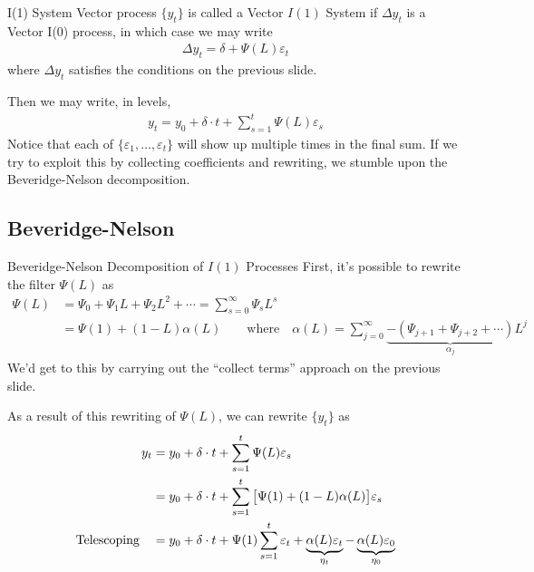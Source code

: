 \documentclass[aspectratio=169, handout]{beamer}
\begin{document}
{\footnotesize
\begin{frame}{I(1) System}
Vector process $\{y_t\}$ is called a \alert{Vector $I(1)$ System}
if $\Delta y_t$ is a Vector I(0) process, in which case we may write
\begin{align*}
  \Delta y_t = \delta + \Psi(L)\varepsilon_t
\end{align*}
where $\Delta y_t$ satisfies the conditions on the previous slide.

\pause
Then we may write, in levels,
\begin{align*}
  y_t
  = y_0 + \delta \cdot t + \sum_{s=1}^t \Psi(L)\varepsilon_s
\end{align*}
\pause
Notice that each of $\{\varepsilon_1,\ldots,\varepsilon_t\}$ will show
up multiple times in the final sum.
If we try to exploit this by \alert{collecting coefficients} and
rewriting, we stumble upon the Beveridge-Nelson decomposition.
\end{frame}
}


\subsection{Beveridge-Nelson}

{\footnotesize
\begin{frame}{Beveridge-Nelson Decomposition of $I(1)$ Processes}
First, it's possible to rewrite the filter $\Psi(L)$ as
\begin{align*}
  \Psi(L)
  &=
  \Psi_0 + \Psi_1L + \Psi_2L^2
  + \cdots
  =
  \sum_{s=0}^\infty
  \Psi_s L^s
  \\
  &=
  \Psi(1)
  +
  (1-L)\alpha(L)
  \qquad\text{where}\quad
  \alpha(L)
  =
  \sum_{j=0}^\infty
  \underbrace{-(\Psi_{j+1}+\Psi_{j+2}+\cdots)}_{\alpha_j}
  L^j
\end{align*}
We'd get to this by carrying out the ``collect terms''
approach on the previous slide.

\pause
As a result of this rewriting of $\Psi(L)$, we can rewrite $\{y_t\}$ as
\begin{align*}
  y_t
  &= y_0 + \delta \cdot t + \sum_{s=1}^t \Psi(L)\varepsilon_s
  \\
  &= y_0 + \delta \cdot t
  + \sum_{s=1}^t
  \big[
    \Psi(1)
    + (1-L)\alpha(L)
  \big]
  \varepsilon_s
  \\
  \text{Telescoping}
  \quad
  &=
  y_0
  + \delta \cdot t
  +
  \Psi(1)
  \sum_{s=1}^t
  \varepsilon_t
  +
  \underbrace{%
    \alpha(L)
    \varepsilon_t
  }_{\eta_t}
  -
  \underbrace{%
    \alpha(L)
    \varepsilon_{0}
  }_{\eta_0}
\end{align*}
\end{frame}
}
\end{document}
